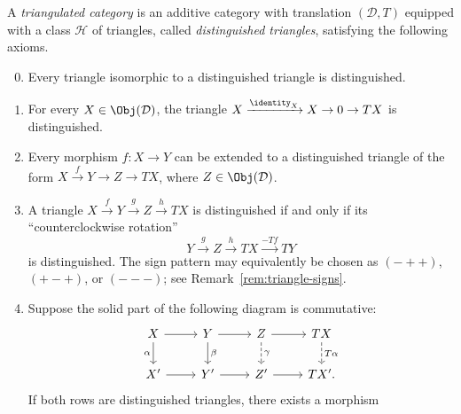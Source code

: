 \begin{definition}
\label{def:triangulated-cat}
	A \emph{triangulated category} is an additive category with translation
	$(\mathcal{D},T)$ equipped with a class $\mathcal{H}$ of triangles, called
	\emph{distinguished triangles}, satisfying the following axioms.
	\begin{enumerate}[(TR1)]
		\setcounter{enumi}{-1}
		\item Every triangle isomorphic to a distinguished triangle is
		distinguished.
		\item For every $X\in\Obj(\mathcal{D})$, the triangle
		$X\xrightarrow{\identity_X}X\to0\to TX$ is distinguished.
		\item Every morphism $f:X\to Y$ can be extended to a distinguished
		triangle of the form $X\xrightarrow{f}Y\to Z\to TX$, where
		$Z\in\Obj(\mathcal{D})$.
		\item A triangle
		$X\xrightarrow{f}Y\xrightarrow{g}Z\xrightarrow{h}TX$ is distinguished
		if and only if its “counterclockwise rotation”
		\[ Y\xrightarrow{g}Z\xrightarrow{h}TX\xrightarrow{-Tf}TY \]
		is distinguished. The sign pattern may equivalently be chosen as
		$(-++)$, $(+-+)$, or $(---)$; see
		Remark~\ref{rem:triangle-signs}.
		\item Suppose the solid part of the following diagram is commutative:
		\[\begin{tikzcd}
			X \arrow[r] \arrow[d,"\alpha"'] &
			Y \arrow[r] \arrow[d,"\beta"] &
			Z \arrow[r] \arrow[dashed,d,"\gamma"] &
			TX \arrow[dashed,d,"T\alpha"] \\
			X' \arrow[r] & Y' \arrow[r] & Z' \arrow[r] & TX'.
		\end{tikzcd}\]
		If both rows are distinguished triangles, there exists a morphism

\end{enumerate}
\end{definition}

